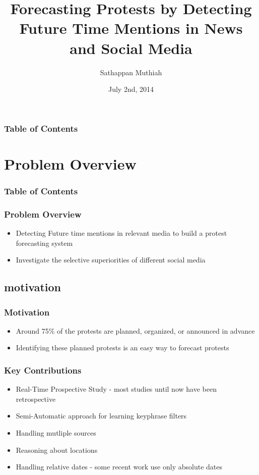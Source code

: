 \documentclass[red]{beamer}
\begin{document}
\title[Planned Protest]{Forecasting Protests by Detecting Future Time Mentions in News and Social Media
}
\author{Sathappan Muthiah}
\date{July 2nd, 2014}
\subject{Computer Science}


\frame{\titlepage}



\begin{frame}
\frametitle{Table of Contents}
\tableofcontents
\end{frame}
\section{Problem Overview}
\begin{frame}
\frametitle{Table of Contents}
\tableofcontents[currentsection]
\end{frame}


\begin{frame}
    \frametitle{Problem Overview}
    \begin{itemize}
        \item
            Detecting Future time mentions in relevant media to build a protest forecasting system
        \item
            Investigate the selective superiorities of different social media
    \end{itemize}
\end{frame}

\subsection{motivation}
\begin{frame}
    \frametitle{Motivation}
    \begin{itemize}
        \item
            Around 75\% of the protests are planned, organized, or announced in advance
        \item
            Identifying these planned protests is an easy way to forecast protests
    \end{itemize}
\end{frame}


\begin{frame}
    \frametitle{Key Contributions}
    \begin{itemize}
        \item
            Real-Time Prospective Study - most studies until now have been retrospective
        \item
            Semi-Automatic approach for learning keyphrase filters
        \item
            Handling mutliple sources
        \item
            Reasoning about locations
        \item
            Handling relative dates - some recent work use only absolute dates
    \end{itemize}
\end{frame}
\end{document}
